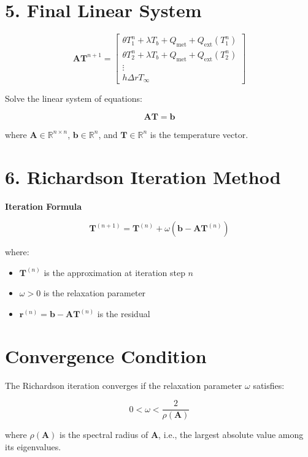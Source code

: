 \documentclass[12pt]{article}
\begin{document}
\section*{5. Final Linear System}

\[
\mathbf{A} \mathbf{T}^{n+1} =
\begin{bmatrix}
\theta T_1^n + \lambda T_b + Q_{\text{met}} + Q_{\text{ext}}(T_1^n) \\
\theta T_2^n + \lambda T_b + Q_{\text{met}} + Q_{\text{ext}}(T_2^n) \\
\vdots \\
h \Delta r T_\infty
\end{bmatrix}
\]

Solve the linear system of equations:

\[
\mathbf{A} \mathbf{T} = \mathbf{b}
\]

where \( \mathbf{A} \in \mathbb{R}^{n \times n} \), \( \mathbf{b} \in \mathbb{R}^n \), and \( \mathbf{T} \in \mathbb{R}^n \) is the temperature vector.

\section*{6. Richardson Iteration Method}

\textbf{Iteration Formula}

\[
\mathbf{T}^{(n+1)} = \mathbf{T}^{(n)} + \omega \left( \mathbf{b} - \mathbf{A} \mathbf{T}^{(n)} \right)
\]

where:
\begin{itemize}
    \item \( \mathbf{T}^{(n)} \) is the approximation at iteration step \( n \)
    \item \( \omega > 0 \) is the relaxation parameter
    \item \( \mathbf{r}^{(n)} = \mathbf{b} - \mathbf{A} \mathbf{T}^{(n)} \) is the residual
\end{itemize}

\section*{Convergence Condition}

The Richardson iteration converges if the relaxation parameter \( \omega \) satisfies:

\[
0 < \omega < \frac{2}{\rho(\mathbf{A})}
\]

where \( \rho(\mathbf{A}) \) is the spectral radius of \( \mathbf{A} \), i.e., the largest absolute value among its eigenvalues.
\end{document}

